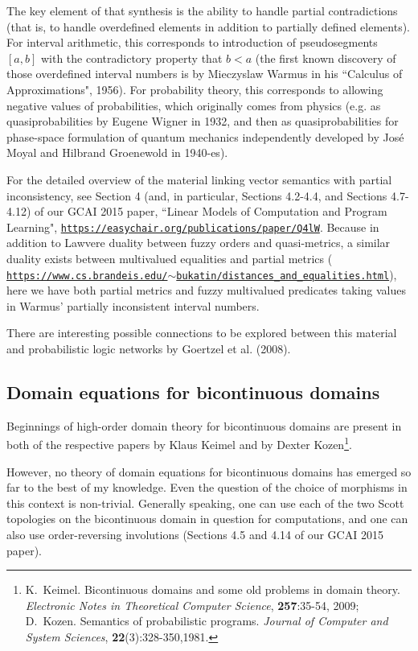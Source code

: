 \documentclass{article}
\begin{document}
The key element of that synthesis is the ability to handle partial contradictions (that is, to handle
overdefined elements in addition to partially defined elements). For interval arithmetic,  
this corresponds to introduction of pseudosegments $[a, b]$ with the contradictory property that
$b < a$ (the first known discovery of those overdefined interval numbers is by Mieczyslaw Warmus in his ``Calculus of Approximations", 1956). For probability theory, this corresponds to allowing negative values of probabilities,
which originally comes from physics (e.g. as quasiprobabilities by Eugene Wigner in 1932, and then as quasiprobabilities for phase-space formulation
of quantum mechanics independently developed by Jos\'e Moyal and Hilbrand Groenewold in 1940-es).

For the detailed overview of the material linking vector semantics with partial inconsistency, see Section 4 (and, in particular, Sections 4.2-4.4, and Sections 4.7-4.12) of our GCAI 2015 paper, ``Linear Models of Computation and Program Learning", \href{https://easychair.org/publications/paper/Q4lW}{\tt https://easychair.org/publications/paper/Q4lW}. Because in addition to Lawvere duality between fuzzy orders and quasi-metrics, a similar duality exists between multivalued equalities and partial metrics ( \href{https://www.cs.brandeis.edu/~bukatin/distances_and_equalities.html}{\tt https://www.cs.brandeis.edu/$\sim$bukatin/distances\_and\_equalities.html}), here we have both partial metrics and fuzzy multivalued predicates taking values in Warmus' partially inconsistent interval numbers.

There are interesting possible connections to be explored between this material and probabilistic logic networks by Goertzel et al. (2008).

\subsection{Domain equations for bicontinuous domains}

Beginnings of high-order domain theory for bicontinuous domains are present in both of the respective papers by Klaus Keimel and by Dexter Kozen\footnote{K.~Keimel. Bicontinuous domains and some old problems in domain theory. {\em Electronic Notes in Theoretical Computer Science}, {\bf 257}:35-54, 2009; D.~Kozen. Semantics of probabilistic programs. {\em Journal of Computer and System Sciences}, {\bf 22}(3):328-350,1981.}.

However, no theory of domain equations for bicontinuous domains has emerged so far to the best of my knowledge.
Even the question of the choice of morphisms in this context is non-trivial. Generally speaking, one can use each of the two Scott topologies
on the bicontinuous domain in question for computations, and one can also use order-reversing involutions (Sections 4.5 and 4.14 of our GCAI 2015 paper).
\end{document}
